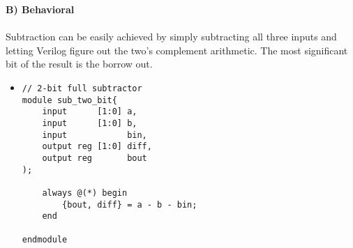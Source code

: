 \documentclass{article}
\begin{document}
\textbf{B) Behavioral}
\\\\
Subtraction can be easily achieved by simply subtracting all three inputs and letting Verilog figure out the two's complement arithmetic.
The most significant bit of the result is the borrow out.
\begin{itemize}
\item[]
\begin{lstlisting}[caption=Behavioral 2-Bit Subtractor]
// 2-bit full subtractor
module sub_two_bit{
    input      [1:0] a,
    input      [1:0] b,
    input            bin,
    output reg [1:0] diff,
    output reg       bout
);

    always @(*) begin
        {bout, diff} = a - b - bin;
    end

endmodule
\end{lstlisting}
\end{itemize}



\newcommand{\gb}{\color{lightgray}\rule{\width}{\height}}
\newcommand{\bb}{\color{lightblue}\rule{\width}{\height}}
\newcommand{\colorbitbox}[3]{%
    \rlap{\bitbox{#2}{\color{#1}\rule{\width}{\height}}}%
\bitbox{#2}{#3}}
\end{document}

